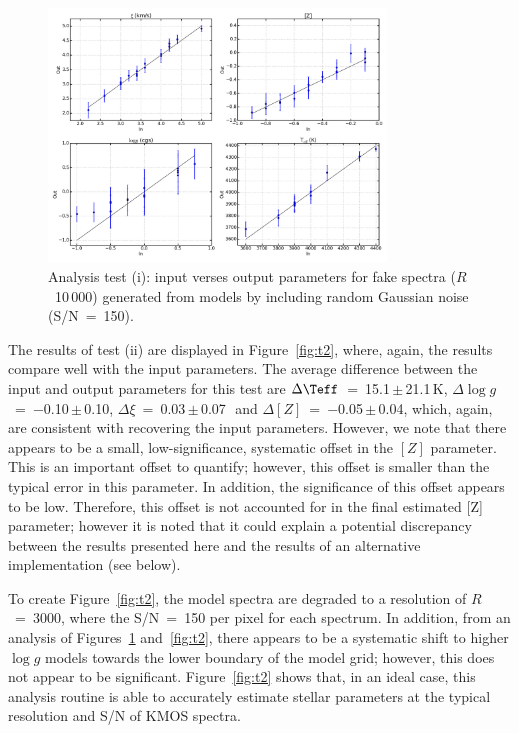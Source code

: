 \begin{figure}
 \centering
 \includegraphics[width=0.80\textwidth]{JAnal/Fakespec-t1-v2}
 \caption[Analysis test (i): input against output parameters using fake RSG spectra at S/N~=~150 ($R$~=~10\,000)]{
 Analysis test (i): input verses output parameters for fake spectra ($R$~10\,000) generated from models by including random Gaussian noise (S/N~=~150).
\label{fig:t1}
         }
\end{figure}


The results of test (ii) are displayed in Figure~\ref{fig:t2}, where, again, the results compare well with the input parameters.
The average difference between the input and output parameters for this test are
$\Delta\Teff$~=~15.1\,$\pm$\,21.1\,K,  %
$\Delta\log g$~=~$-$0.10\,$\pm$\,0.10, %
$\Delta\xi$~=~0.03\,$\pm$\,0.07\,\kms~and %
$\Delta[Z]$~=~$-$0.05\,$\pm$\,0.04,     %
which, again, are consistent with recovering the input parameters.
However, we note that there appears to be a small, low-significance, systematic offset in the $[Z]$ parameter.
This is an important offset to quantify; however, this offset is smaller than the typical error in this parameter.
In addition, the significance of this offset appears to be low.
Therefore, this offset is not accounted for in the final estimated [Z] parameter; however it is noted that it could explain a potential discrepancy between the results presented here and the results of an alternative implementation (see below).

To create Figure~\ref{fig:t2}, the model spectra are degraded to a resolution of $R$~=~3000, where the S/N~=~150 per pixel for each spectrum.
In addition, from an analysis of Figures~\ref{fig:t1} and~\ref{fig:t2}, there appears to be a systematic shift to higher $\log g$ models towards the lower boundary of the model grid; however, this does not appear to be significant.
Figure~\ref{fig:t2} shows that, in an ideal case, this analysis routine is able to accurately estimate stellar parameters at the typical resolution and S/N of KMOS spectra.

